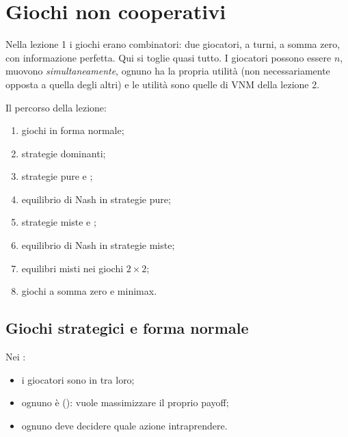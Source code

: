 \chapter{Giochi non cooperativi}

\parteteoria

Nella lezione 1 i giochi erano combinatori: due giocatori, a turni, a somma zero, con
informazione perfetta. Qui si toglie quasi tutto. I giocatori possono essere $n$, muovono
\emph{simultaneamente}, ognuno ha la propria utilità (non necessariamente opposta a quella
degli altri) e le utilità sono quelle di VNM della lezione 2.

Il percorso della lezione:
\begin{enumerate}[label=\arabic*.]
  \item giochi in forma normale;
  \item strategie dominanti;
  \item strategie pure e ;
  \item equilibrio di Nash in strategie pure;
  \item strategie miste e ;
  \item equilibrio di Nash in strategie miste;
  \item equilibri misti nei giochi $2\times2$;
  \item giochi a somma zero e minimax.
\end{enumerate}

\section{Giochi strategici e forma normale}

Nei :
\begin{itemize}
  \item i giocatori sono in  tra loro;
  \item ognuno è  (): vuole massimizzare il proprio payoff;
  \item ognuno deve decidere quale azione intraprendere.
\end{itemize}

